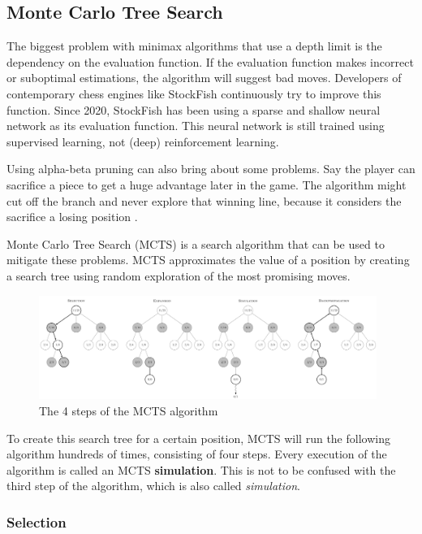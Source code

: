 \documentclass{article}
\begin{document}
\subsection{Monte Carlo Tree Search}

The biggest problem with minimax algorithms that use a depth limit is the dependency on the evaluation function.
If the evaluation function makes incorrect or suboptimal estimations, the algorithm will suggest bad moves. 
Developers of contemporary chess engines like StockFish continuously try to improve this function. 
Since 2020, StockFish has been using a sparse and shallow neural network as its evaluation function. 
This neural network is still trained using supervised learning, not (deep) reinforcement learning.

Using alpha-beta pruning can also bring about some problems. Say the player can sacrifice a piece
to get a huge advantage later in the game. The algorithm might cut off the branch and never explore that winning line, 
because it considers the sacrifice a losing position \cite{MinimaxMonteCarlo}. 

Monte Carlo Tree Search (MCTS) \cite{MonteCarloTree2022} is a search algorithm that can be used to mitigate these problems.
MCTS approximates the value of a position by creating a search tree using random exploration of the most promising moves.

\begin{figure}[H]
    \centering
    \includegraphics[width=0.98\textwidth]{img/MCTS-steps.png}
    \caption{The 4 steps of the MCTS algorithm \cite{MonteCarloTree2022}}
\end{figure}

To create this search tree for a certain position, MCTS will run the following algorithm hundreds of times, 
consisting of four steps. 
Every execution of the algorithm is called an MCTS \textbf{simulation}. 
This is not to be confused with the third step of the algorithm, which is also called \textit{simulation}. 

\subsubsection{Selection}
\end{document}
